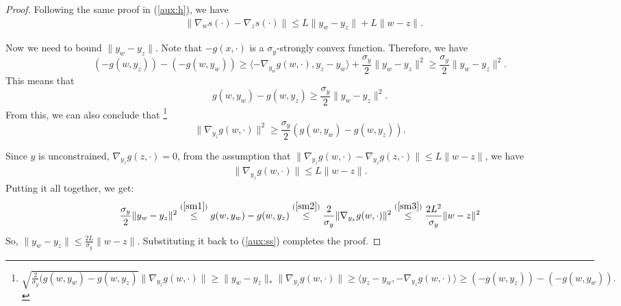 \documentclass[pmlr]{jmlr} %
\newcommand{\yx}[1]{y_{#1}}
\begin{document}
\begin{proof}
Following the same proof in (\ref{aux:h}), we have
\begin{equation} \label{aux:ss}
\begin{aligned}
& \| \nabla_{w} s(\cdot) - \nabla_{z} s(\cdot )\| 
\leq L \|  \yx{w}  - \yx{z}  \| 
+ 
L \| w - z \|.
\end{aligned}
\end{equation}

Now we need to bound $\| \yx{w} - \yx{z} \|$. 
Note that $-g(x,\cdot)$ is a $\sigma_{y}$-strongly convex function.
  Therefore, we have 
\begin{equation} \label{sm1}
( - g(w,\yx{z}) ) -  ( - g(w,\yx{w}) )  \ge \langle -\nabla_{\yx{w}} g(w,\cdot), \yx{z} - \yx{w} \rangle + \frac{\sigma_{y}}{2}\| \yx{w} - \yx{z} \|^{2} \geq \frac{\sigma_{y}}{2} \| \yx{w} - \yx{z}\|^{2} . 
\end{equation} 
This means that 
\[ g(w,\yx{w}) - g(w,\yx{z}) \geq \frac{\sigma_{y}}{2} \| \yx{w} - \yx{z}\|^{2}.\]
From this, we can also conclude that 
\footnote{ $ \sqrt{ \frac{2}{\sigma_{y}} ( g(w,\yx{w}) - g(w,\yx{z})   } \| \nabla_{\yx{z}} g(w, \cdot) \|
\geq \|  \yx{w} - \yx{z} \|_{*} \| \nabla_{\yx{z}} g(w, \cdot) \| \geq \langle \yx{z} - \yx{w} , -\nabla_{\yx{z}} g(w, \cdot) \rangle \geq ( - g(w,\yx{z}) ) -  ( - g(w,\yx{w}) ).$} 
\begin{equation} \label{sm2}
\| \nabla_{\yx{z}} g(w, \cdot)  \|^{2} \geq \frac{\sigma_{y}}{2} ( g(w,\yx{w})-g(w,\yx{z}) ).
\end{equation}

  Since $y$ is unconstrained, $\nabla_{\yx{z}} g(z,\cdot) = 0$, from 
the assumption that $\| \nabla_{\yx{z}} g(w,\cdot) - \nabla_{\yx{z}} g(z,\cdot) \| \le L \| w - z \|$,
we have
  \begin{align} \label{sm3}
  \| \nabla_{\yx{z}} g(w,\cdot) \| \le L \| w - z\|.
  \end{align}
  Putting it all together, we get:
  \begin{equation}
  \begin{aligned}
&  \frac{\sigma_{y}}{2} \| \yx{w} - \yx{z} \|^{2}  \overset{(\ref{sm1})}{\le} g(w,\yx{w}) -g(w,\yx{z})  
 \overset{ (\ref{sm2}) }{\leq} \frac{2}{\sigma_{y}} \| \nabla_{\yx{z}} g(w,\cdot)\|^{2} 
\overset{ (\ref{sm3}) }{\leq} \frac{2L^{2}}{\sigma_{y}} \| w - z\|^{2}\\
  \end{aligned}
  \end{equation}
  So, $\| y_{w} - y_{z}\|\leq \frac{2 L}{\sigma_{y}} \| w - z\|$.
  Substituting it back to (\ref{aux:ss}) completes the proof.
\end{proof}
\end{document}
